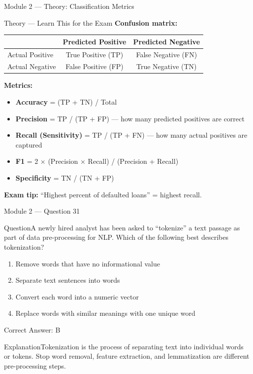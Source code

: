 \documentclass[aspectratio=169,10pt]{beamer}
\newcommand{\question}[1]{\begin{block}{Question}#1\end{block}}
\newcommand{\options}[4]{%
	\begin{enumerate}[label=\Alph*.,leftmargin=*]
		\item #1
		\item #2
		\item #3
		\item #4
	\end{enumerate}
}
\newcommand{\answerbox}[1]{\begin{exampleblock}{Correct Answer: #1}\end{exampleblock}}
\newcommand{\explain}[1]{\begin{block}{Explanation}#1\end{block}}
\newcommand{\theory}[1]{%
	\begin{block}{Theory --- Learn This for the Exam}
		\small #1
	\end{block}
}
\begin{document}
	\begin{frame}{Module 2 --- Theory: Classification Metrics}
		\theory{
			\textbf{Confusion matrix:}
			\begin{center}
				\small
				\begin{tabular}{@{}lcc@{}}
					\toprule
					& Predicted Positive & Predicted Negative \\
					\midrule
					Actual Positive & True Positive (TP) & False Negative (FN) \\
					Actual Negative & False Positive (FP) & True Negative (TN) \\
					\bottomrule
				\end{tabular}
			\end{center}
			\textbf{Metrics:}
			\begin{itemize}
				\item \textbf{Accuracy} = (TP + TN) / Total
				\item \textbf{Precision} = TP / (TP + FP) --- how many predicted positives are correct
				\item \textbf{Recall (Sensitivity)} = TP / (TP + FN) --- how many actual positives are captured
				\item \textbf{F1} = 2 × (Precision × Recall) / (Precision + Recall)
				\item \textbf{Specificity} = TN / (TN + FP)
			\end{itemize}
			\textbf{Exam tip:} ``Highest percent of defaulted loans'' = highest recall.
		}
	\end{frame}
	
	\begin{frame}{Module 2 --- Question 31}
		\question{A newly hired analyst has been asked to ``tokenize'' a text passage as part of data pre-processing for NLP. Which of the following best describes tokenization?}
		\options{Remove words that have no informational value}{Separate text sentences into words}{Convert each word into a numeric vector}{Replace words with similar meanings with one unique word}
		\answerbox{B}
		\explain{Tokenization is the process of separating text into individual words or tokens. Stop word removal, feature extraction, and lemmatization are different pre-processing steps.}
	\end{frame}
	
\end{document}
